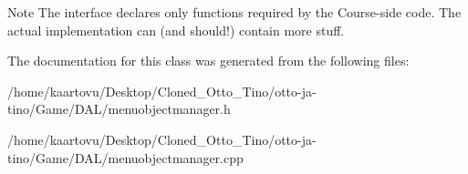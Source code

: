 \begin{DoxyNote}{Note}
The interface declares only functions required by the Course-\/side code. The actual implementation can (and should!) contain more stuff. 
\end{DoxyNote}


The documentation for this class was generated from the following files\-:\begin{DoxyCompactItemize}
\item 
/home/kaartovu/\-Desktop/\-Cloned\-\_\-\-Otto\-\_\-\-Tino/otto-\/ja-\/tino/\-Game/\-D\-A\-L/menuobjectmanager.\-h\item 
/home/kaartovu/\-Desktop/\-Cloned\-\_\-\-Otto\-\_\-\-Tino/otto-\/ja-\/tino/\-Game/\-D\-A\-L/menuobjectmanager.\-cpp\end{DoxyCompactItemize}
